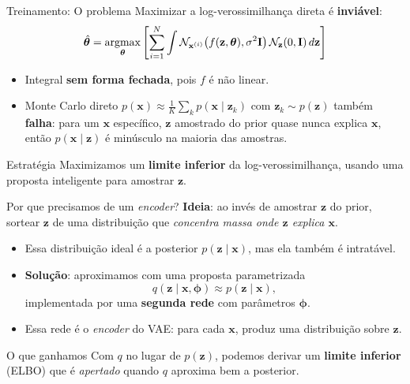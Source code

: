 \documentclass[aspectratio=169,xcolor=dvipsnames]{beamer}
\begin{document}
  \begin{frame}{Treinamento: O problema}
    Maximizar a log-verossimilhança direta é \textbf{inviável}:
    \[
      \hat{\bm{\theta}} = \operatorname*{argmax}_{\bm{\theta}}
      \left[\sum_{i=1}^{N} \int
        \mathcal{N}_{\mathbf{x}^{(i)}}\!\left(f(\mathbf{z}, \bm{\theta}), \sigma^{2}\mathbf{I}\right)
        \mathcal{N}_{\mathbf{z}}(0, \mathbf{I})\, d\mathbf{z}
      \right]
    \]
    \vspace{0.2em}
    \begin{itemize}
      \item Integral \textbf{sem forma fechada}, pois $f$ é não linear.
      \item Monte Carlo direto $p(\mathbf{x}) \approx \tfrac{1}{K}\sum_{k} p(\mathbf{x}\mid \mathbf{z}_k)$
      com $\mathbf{z}_k \sim p(\mathbf{z})$ também \textbf{falha}: para um $\mathbf{x}$ específico,
      $\mathbf{z}$ amostrado do prior quase nunca explica $\mathbf{x}$, então
      $p(\mathbf{x}\mid \mathbf{z})$ é minúsculo na maioria das amostras.
    \end{itemize}
    \begin{alertblock}{Estratégia}
      Maximizamos um \textbf{limite inferior} da log-verossimilhança,
      usando uma proposta inteligente para amostrar $\mathbf{z}$.
    \end{alertblock}
  \end{frame}

  \begin{frame}{Por que precisamos de um \textit{encoder}?}
    \textbf{Ideia}: ao invés de amostrar $\mathbf{z}$ do prior, sortear $\mathbf{z}$ de
    uma distribuição que \emph{concentra massa onde $\mathbf{z}$ explica $\mathbf{x}$}.
    \vspace{0.4em}
    \begin{itemize}
      \item Essa distribuição ideal é a posterior $p(\mathbf{z}\mid \mathbf{x})$, mas ela
      também é intratável.
      \item \textbf{Solução}: aproximamos com uma proposta parametrizada
      \[
        q(\mathbf{z}\mid \mathbf{x}, \bm{\phi}) \approx p(\mathbf{z}\mid \mathbf{x}),
      \]
      implementada por uma \textbf{segunda rede} com parâmetros $\bm{\phi}$.
      \item Essa rede é o \textcolor{EncRed}{\textit{encoder}} do VAE:
      para cada $\mathbf{x}$, produz uma distribuição sobre $\mathbf{z}$.
    \end{itemize}
    \vspace{0.2em}
    \begin{block}{O que ganhamos}
      Com $q$ no lugar de $p(\mathbf{z})$, podemos derivar um \textbf{limite
      inferior} (ELBO) que é \emph{apertado} quando $q$ aproxima bem a
      posterior.
    \end{block}
  \end{frame}
\end{document}

